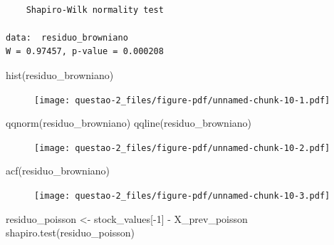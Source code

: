 \documentclass[
  letterpaper,
  DIV=11,
  numbers=noendperiod]{scrreprt}
\newenvironment{Shaded}{\begin{snugshade}}{\end{snugshade}}
\newcommand{\DecValTok}[1]{\textcolor[rgb]{0.68,0.00,0.00}{#1}}
\newcommand{\FunctionTok}[1]{\textcolor[rgb]{0.28,0.35,0.67}{#1}}
\newcommand{\NormalTok}[1]{\textcolor[rgb]{0.00,0.23,0.31}{#1}}
\newcommand{\OtherTok}[1]{\textcolor[rgb]{0.00,0.23,0.31}{#1}}
\newcommand{\SpecialCharTok}[1]{\textcolor[rgb]{0.37,0.37,0.37}{#1}}
\begin{document}
\begin{verbatim}

    Shapiro-Wilk normality test

data:  residuo_browniano
W = 0.97457, p-value = 0.000208
\end{verbatim}

\begin{Shaded}
\begin{Highlighting}[]
\FunctionTok{hist}\NormalTok{(residuo\_browniano)}
\end{Highlighting}
\end{Shaded}

\begin{figure}[H]

{\centering \texttt{[image: questao-2\_files/figure-pdf/unnamed-chunk-10-1.pdf]}

}

\end{figure}

\begin{Shaded}
\begin{Highlighting}[]
\FunctionTok{qqnorm}\NormalTok{(residuo\_browniano)}
\FunctionTok{qqline}\NormalTok{(residuo\_browniano)}
\end{Highlighting}
\end{Shaded}

\begin{figure}[H]

{\centering \texttt{[image: questao-2\_files/figure-pdf/unnamed-chunk-10-2.pdf]}

}

\end{figure}

\begin{Shaded}
\begin{Highlighting}[]
\FunctionTok{acf}\NormalTok{(residuo\_browniano)}
\end{Highlighting}
\end{Shaded}

\begin{figure}[H]

{\centering \texttt{[image: questao-2\_files/figure-pdf/unnamed-chunk-10-3.pdf]}

}

\end{figure}

\begin{Shaded}
\begin{Highlighting}[]
\NormalTok{residuo\_poisson }\OtherTok{\textless{}{-}}\NormalTok{ stock\_values[}\SpecialCharTok{{-}}\DecValTok{1}\NormalTok{] }\SpecialCharTok{{-}}\NormalTok{ X\_prev\_poisson}
\FunctionTok{shapiro.test}\NormalTok{(residuo\_poisson)}
\end{Highlighting}
\end{Shaded}
\end{document}
